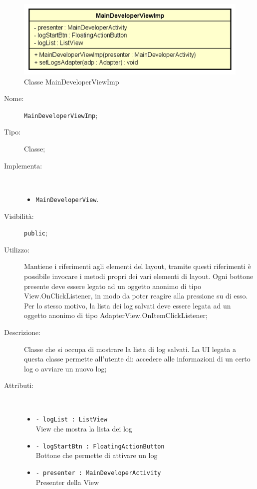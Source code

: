 \documentclass[../DefinizioneDiProdotto.tex]{subfiles}
\begin{document}
    \begin{figure}[H]
        \centering
        \includegraphics{img/MainDeveloperViewImp.png}
        \caption{Classe MainDeveloperViewImp}\label{fig:view::MainDeveloperViewImp} 
    \end{figure}
    \begin{description}
\item[Nome:] \texttt{MainDeveloperViewImp};
\item[Tipo:] Classe;
\item[Implementa:] \
\begin{itemize}
\item \texttt{MainDeveloperView}.

\end{itemize}
\item[Visibilità:] \texttt{public};
\item[Utilizzo:] Mantiene i riferimenti agli elementi del layout, tramite questi riferimenti è possibile invocare i metodi propri dei vari elementi di layout.
Ogni bottone presente deve essere legato ad un oggetto anonimo di tipo View.OnClickListener, in modo da poter reagire alla pressione su di esso. Per lo stesso motivo, la lista dei log salvati deve essere legata ad un oggetto anonimo di tipo AdapterView.OnItemClickListener;
\item[Descrizione:] Classe che si occupa di mostrare la lista di log salvati. La UI legata a questa classe permette all'utente di: accedere alle informazioni di un certo log o avviare un nuovo log;
\item[Attributi:] \
\begin{itemize}
\item \texttt{- logList : ListView}\\
View che mostra la lista dei log

\item \texttt{- logStartBtn : FloatingActionButton}\\
Bottone che permette di attivare un log

\item \texttt{- presenter : MainDeveloperActivity}\\
Presenter della View


\end{itemize}
\end{description}
\end{document}
